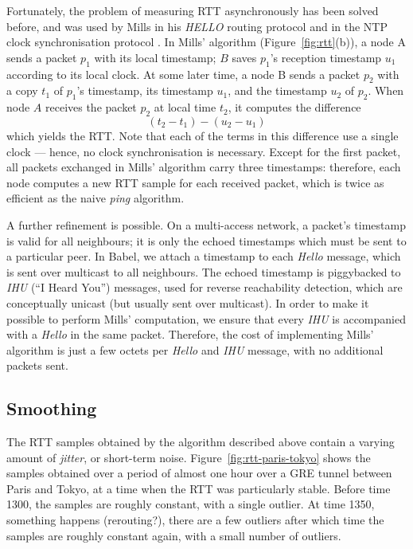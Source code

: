 \documentclass[conference,letterpaper]{IEEEtran}
\begin{document}
Fortunately, the problem of measuring RTT asynchronously has been
solved before, and was used by Mills in his \emph{HELLO} routing
protocol \cite{mills83} and in the NTP clock synchronisation protocol
\cite{NTPv4}.  In Mills' algorithm (Figure~\ref{fig:rtt}(b)), a node
A sends a packet $p_1$ with its local timestamp; $B$ saves $p_1$'s
reception timestamp $u_1$ according to its local clock.  At some later
time, a node B sends a packet $p_2$ with a copy $t_1$ of $p_1$'s
timestamp, its timestamp $u_1$, and the timestamp $u_2$ of $p_2$.
When node $A$ receives the packet $p_2$ at local time $t_2$, it
computes the difference
\[ (t_2 - t_1) - (u_2 - u_1) \]
which yields the RTT.  Note that each of the terms in this difference
use a single clock --- hence, no clock synchronisation is necessary.
Except for the first packet, all packets exchanged in Mills' algorithm
carry three timestamps: therefore, each node computes a new RTT sample
for each received packet, which is twice as efficient as the naive
\emph{ping} algorithm.

A further refinement is possible.  On a multi-access network,
a packet's timestamp is valid for all neighbours; it is only the
echoed timestamps which must be sent to a particular peer.  In Babel,
we attach a timestamp to each \emph{Hello} message, which is sent over
multicast to all neighbours.  The echoed timestamp is piggybacked to
\emph{IHU} (``I Heard You'') messages, used for reverse reachability
detection, which are conceptually unicast (but usually sent over
multicast).  In order to make it possible to perform Mills'
computation, we ensure that every \emph{IHU} is accompanied with
a \emph{Hello} in the same packet.  Therefore, the cost of
implementing Mills' algorithm is just a few octets per \emph{Hello}
and \emph{IHU} message, with no additional packets sent.

\subsection{Smoothing}

The RTT samples obtained by the algorithm described above contain
a varying amount of \emph{jitter}, or short-term noise.
Figure~\ref{fig:rtt-paris-tokyo} shows the samples obtained over
a period of almost one hour over a GRE tunnel between Paris and Tokyo,
at a time when the RTT was particularly stable.  Before time 1300, the
samples are roughly constant, with a single outlier.  At time 1350,
something happens (rerouting?), there are a few outliers after which
time the samples are roughly constant again, with a small number of
outliers.
\end{document}
